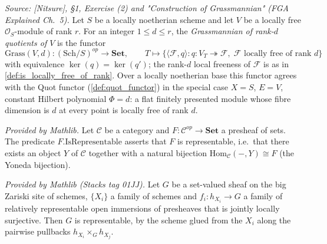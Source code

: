 \begin{definition}
  \textit{Source: [Nitsure], \S 1, Exercise (2) and "Construction of
  Grassmannian" (FGA Explained Ch.~5).}
  Let \(S\) be a locally noetherian scheme and let \(V\) be a locally free
  \(\mathcal{O}_S\)-module of rank \(r\). For an integer \(1 \le d \le r\), the
  \emph{Grassmannian of rank-\(d\) quotients of \(V\)} is the functor
  \[
    \mathrm{Grass}(V, d) : (\mathrm{Sch}/S)^{op} \longrightarrow \mathbf{Set},
    \qquad
    T \longmapsto \{ \langle \mathcal{F}, q\rangle :
    q : V_T \twoheadrightarrow \mathcal{F},\; \mathcal{F}
    \text{ locally free of rank } d \}
  \]
  with equivalence \(\ker(q) = \ker(q')\); the rank-\(d\) local freeness of
  \(\mathcal{F}\) is as in \cref{def:is_locally_free_of_rank}. Over a locally
  noetherian base this functor agrees with the Quot functor
  (\cref{def:quot_functor}) in the special case \(X = S\), \(E = V\), constant
  Hilbert polynomial \(\Phi = d\): a flat finitely presented module whose fibre
  dimension is \(d\) at every point is locally free of rank \(d\).
\end{definition}

\begin{lemma}
  \label{lem:functor_is_representable_mathlib}
  \mathlibok
  \textit{Provided by Mathlib.}
  Let \(\mathcal{C}\) be a category and \(F : \mathcal{C}^{op} \to \mathbf{Set}\)
  a presheaf of sets. The predicate \(F.\mathrm{IsRepresentable}\) asserts that
  \(F\) is representable, i.e.\ that there exists an object \(Y\) of
  \(\mathcal{C}\) together with a natural bijection
  \(\mathrm{Hom}_{\mathcal{C}}(-, Y) \cong F\) (the Yoneda bijection).
\end{lemma}

\begin{lemma}
  \label{lem:local_representability_mathlib}
  \mathlibok
  \textit{Provided by Mathlib (Stacks tag 01JJ).}
  Let \(G\) be a set-valued sheaf on the big Zariski site of schemes,
  \(\{X_i\}\) a family of schemes and \(f_i : h_{X_i} \to G\) a family of
  relatively representable open immersions of presheaves that is jointly
  locally surjective.  Then \(G\) is representable, by the scheme glued from
  the \(X_i\) along the pairwise pullbacks \(h_{X_i} \times_G h_{X_j}\).
\end{lemma}

